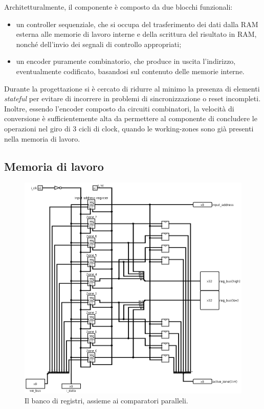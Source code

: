 \documentclass[11pt,a4paper]{article}
\begin{document}
Architetturalmente, il componente è composto da due blocchi funzionali:
\begin{itemize}
    \item un controller sequenziale, che si occupa del trasferimento dei dati dalla RAM esterna alle memorie di lavoro interne e della scrittura del
        risultato in RAM, nonché dell'invio dei segnali di controllo appropriati;
    \item un encoder puramente combinatorio, che produce in uscita l'indirizzo, eventualmente codificato, basandosi sul contenuto delle memorie
        interne.
\end{itemize}
Durante la progettazione si è cercato di ridurre al minimo la presenza di elementi \emph{stateful} per evitare di incorrere in problemi di
sincronizzazione o reset incompleti. Inoltre, essendo l'encoder composto da circuiti combinatori, la velocità di conversione è sufficientemente alta da
permettere al componente di concludere le operazioni nel giro di 3 cicli di clock, quando le working-zones sono già presenti nella memoria di lavoro.

\subsection{Memoria di lavoro}
\begin{figure}[htp]
    \includegraphics[scale=0.39]{memories.png}
    \caption[Memorie e comparatori]{Il banco di registri, assieme ai comparatori paralleli.}
\end{figure}
\end{document}
